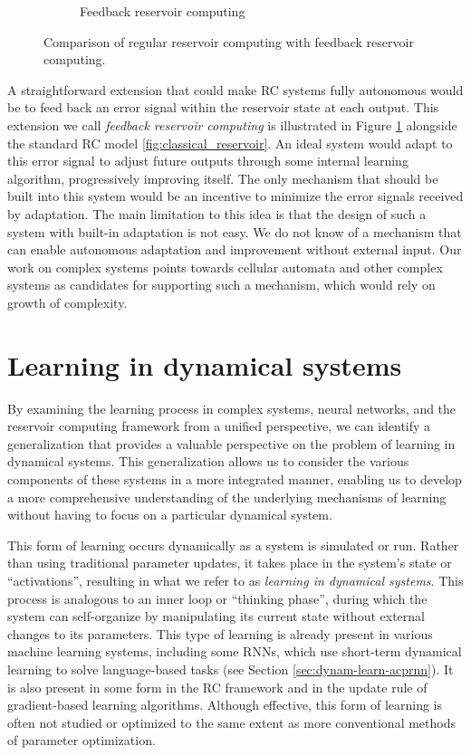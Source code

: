 \begin{figure}[htbp]
\begin{subfigure}[t]{.45\linewidth}
    \caption{Feedback reservoir computing}
    \label{fig:feedback_reservoir}
  \end{subfigure}
  \caption{Comparison of regular reservoir computing with feedback reservoir
    computing.}
  \label{"waiting for reftex-label call..."}
\end{figure}

A straightforward extension that could make \ac{RC} systems fully autonomous
would be to feed back an error signal within the reservoir state at each
output. This extension we call \emph{feedback reservoir computing} is
illustrated in Figure \ref{fig:feedback_reservoir} alongside the standard
\ac{RC} model \ref{fig:classical_reservoir}. An ideal system would adapt to this
error signal to adjust future outputs through some internal learning algorithm,
progressively improving itself. The only mechanism that should be built into
this system would be an incentive to minimize the error signals received by
adaptation. The main limitation to this idea is that the design of such a system with
built-in adaptation is not easy. We do not know of a mechanism that can enable
autonomous adaptation and improvement without external input. Our work on
complex systems points towards cellular automata and other complex systems as
candidates for supporting such a mechanism, which would rely on growth of
complexity.

\section{Learning in dynamical systems}

By examining the learning process in complex systems, neural networks, and
the reservoir computing framework from a unified perspective, we can
identify a generalization that provides a valuable perspective on the problem of
learning in dynamical systems. This generalization allows us to consider the
various components of these systems in a more integrated manner, enabling us to
develop a more comprehensive understanding of the underlying mechanisms of
learning without having to focus on a particular dynamical system.

This form of learning occurs dynamically as a system is simulated or run. Rather
than using traditional parameter updates, it takes place in the system's state
or ``activations'', resulting in what we refer to as \emph{learning in dynamical
  systems}. This process is analogous to an inner loop or ``thinking phase'',
during which the system can self-organize by manipulating its current state
without external changes to its parameters. This type of learning is already
present in various machine learning systems, including some \acfp{RNN}, which
use short-term dynamical learning to solve language-based tasks (see Section
\ref{sec:dynam-learn-acprnn}). It is also present in some form in the \ac{RC}
framework and in the update rule of gradient-based learning algorithms. Although
effective, this form of learning is often not studied or optimized to the same
extent as more conventional methods of parameter optimization.


